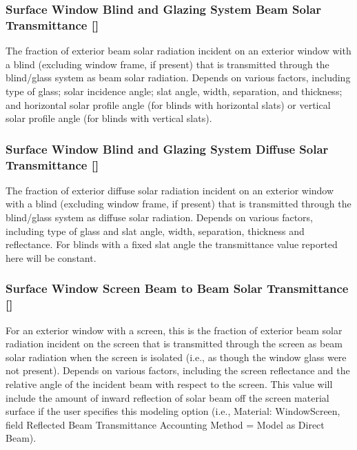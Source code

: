\subsubsection{Surface Window Blind and Glazing System Beam Solar Transmittance {[]}}\label{surface-window-blind-and-glazing-system-beam-solar-transmittance}

The fraction of exterior beam solar radiation incident on an exterior window with a blind (excluding window frame, if present) that is transmitted through the blind/glass system as beam solar radiation. Depends on various factors, including type of glass; solar incidence angle; slat angle, width, separation, and thickness; and horizontal solar profile angle (for blinds with horizontal slats) or vertical solar profile angle (for blinds with vertical slats).

\subsubsection{Surface Window Blind and Glazing System Diffuse Solar Transmittance {[]}}\label{surface-window-blind-and-glazing-system-diffuse-solar-transmittance}

The fraction of exterior diffuse solar radiation incident on an exterior window with a blind (excluding window frame, if present) that is transmitted through the blind/glass system as diffuse solar radiation. Depends on various factors, including type of glass and slat angle, width, separation, thickness and reflectance. For blinds with a fixed slat angle the transmittance value reported here will be constant.

\subsubsection{Surface Window Screen Beam to Beam Solar Transmittance {[]}}\label{surface-window-screen-beam-to-beam-solar-transmittance}

For an exterior window with a screen, this is the fraction of exterior beam solar radiation incident on the screen that is transmitted through the screen as beam solar radiation when the screen is isolated (i.e., as though the window glass were not present). Depends on various factors, including the screen reflectance and the relative angle of the incident beam with respect to the screen. This value will include the amount of inward reflection of solar beam off the screen material surface if the user specifies this modeling option (i.e., Material: WindowScreen, field Reflected Beam Transmittance Accounting Method = Model as Direct Beam).

